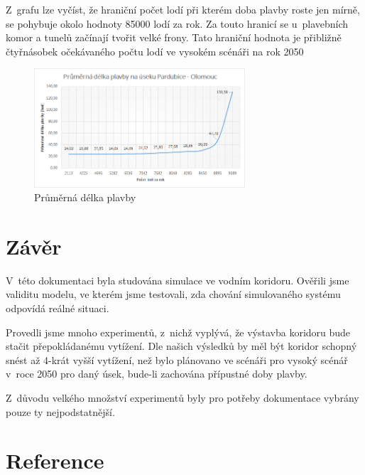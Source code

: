\documentclass[11pt,a4paper]{article}
\begin{document}
      Z~grafu lze vyčíst, že hraniční počet lodí při kterém doba plavby roste
      jen mírně, se pohybuje okolo hodnoty 85000 lodí za rok. Za touto hranicí
      se u~plavebních komor a tunelů začínají tvořit velké frony.
      Tato hraniční hodnota je přibližně čtyřnásobek očekávaného počtu lodí
      ve vysokém scénáři na rok 2050


      \begin{figure}[H]
        \centering
        \includegraphics[width=0.7\textwidth, natwidth=940, natheight=325]
                        {lode.png}
        \caption{Průměrná délka plavby} \label{pce-olm}
      \end{figure}

  \section{Závěr}

    V~této dokumentaci byla studována simulace ve vodním koridoru.
    Ověřili jsme validitu modelu, ve kterém jsme testovali, zda chování
    simulovaného systému odpovídá reálné situaci.

    Provedli jsme mnoho experimentů, z~nichž vyplývá, že výstavba koridoru bude
    stačit přepokládanému vytížení. Dle našich výsledků by měl být koridor
    schopný snést až 4-krát vyšší vytížení, než bylo plánovano ve scénáři pro
    vysoký scénář v~roce 2050 pro daný úsek, bude-li zachována přípustné doby
    plavby.

    Z~důvodu velkého množství experimentů byly pro potřeby dokumentace vybrány
    pouze ty nejpodstatnější.

  \section{Reference}
\end{document}
